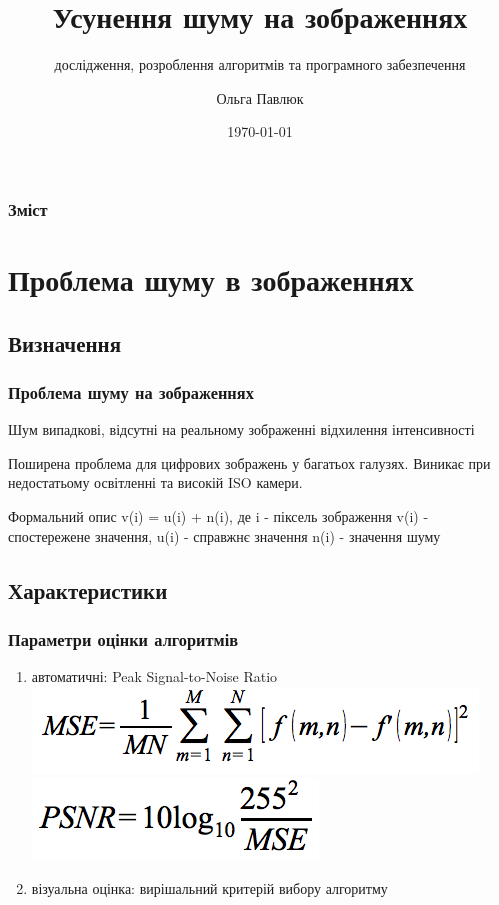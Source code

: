 \documentclass[12pt]{beamer}
\title{Усунення шуму на зображеннях}
\author{Ольга Павлюк}
\subtitle{{ дослідження,  розроблення алгоритмів та програмного забезпечення}}
\institute{Національний університет "Львівська політехніка", кафедра ПЗ}
\date{\today}
\begin{document}
\begin{frame}
	\titlepage
\end{frame}

\begin{frame}
	\frametitle{Зміст} 
	\tableofcontents
\end{frame}

\section{Проблема шуму в зображеннях}
\subsection{Визначення}
\begin{frame}\frametitle{Проблема шуму на зображеннях}
	\begin{block}{Шум}
	випадкові, відсутні на реальному зображенні відхилення інтенсивності
	\end{block}
	\linebreak 
	\pause
	Поширена проблема для цифрових зображень у багатьох галузях.\linebreak
	Виникає при недостатьому освітленні та високій ISO камери. 
	\pause
	\begin{block}{Формальний опис}
		v(i) = u(i) + n(i), де i - піксель зображення \linebreak
		v(i) - спостережене значення, u(i) - справжнє значення \linebreak
		n(i) - значення шуму 
	\end{block}
\end{frame}

\subsection{Характеристики}
\begin{frame}\frametitle{Параметри оцінки алгоритмів}
	\begin{enumerate}
		\item автоматичні: Peak Signal-to-Noise Ratio \linebreak
		\includegraphics[scale=0.4]{images/mse} \linebreak
		\includegraphics[scale=0.4]{images/psnr} \linebreak
		\item візуальна оцінка: вирішальний критерій вибору алгоритму
	\end{enumerate}
\end{frame}
\end{document}
